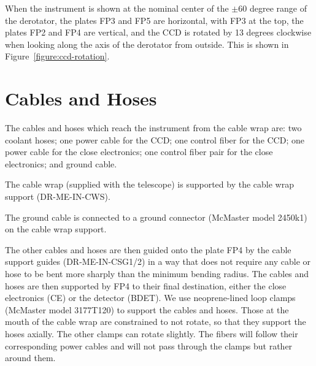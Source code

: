\documentclass{article}
\begin{document}
When the instrument is shown at the nominal center of the $\pm60$ degree range of the derotator, the plates FP3 and FP5 are horizontal, with FP3 at the top, the plates FP2 and FP4 are vertical, and the CCD is rotated by 13 degrees clockwise when looking along the axis of the derotator from outside. This is shown in Figure~\ref{figure:ccd-rotation}.

\clearpage
\section{Cables and Hoses}

The cables and hoses which reach the instrument from the cable wrap are: two coolant hoses; one power cable for the CCD; one control fiber for the CCD; one power cable for the close electronics; one control fiber pair for the close electronics; and ground cable.

The cable wrap (supplied with the telescope) is supported by the cable wrap support (DR-ME-IN-CWS). 

The ground cable is connected to a ground connector (McMaster model 2450k1) on the cable wrap support. 

The other cables and hoses are then guided onto the plate FP4 by the cable support guides (DR-ME-IN-CSG1/2) in a way that does not require any cable or hose to be bent more sharply than the minimum bending radius. The cables and hoses are then supported by FP4 to their final destination, either the close electronics (CE) or the detector (BDET). We use neoprene-lined loop clamps (McMaster model 3177T120) to support the cables and hoses. Those at the mouth of the cable wrap are constrained to not rotate, so that they support the hoses axially. The other clamps can rotate slightly. The fibers will follow their corresponding power cables and will not pass through the clamps but rather around them.
\end{document}
